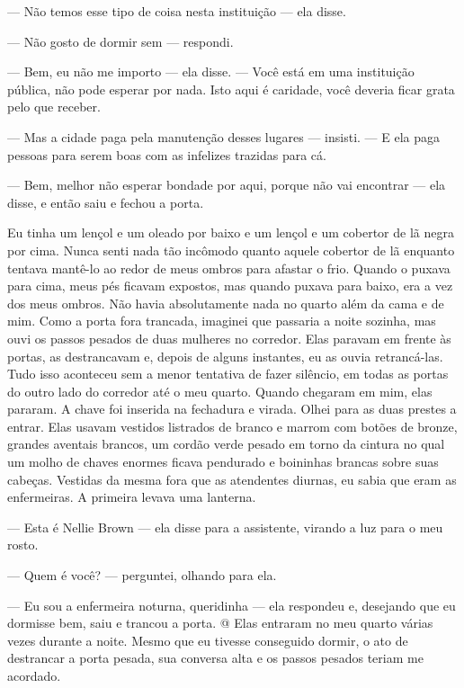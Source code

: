 --- Não temos esse tipo de coisa nesta instituição --- ela disse.

--- Não gosto de dormir sem --- respondi.

--- Bem, eu não me importo --- ela disse. --- Você está em uma
instituição pública, não pode esperar por nada. Isto aqui é caridade,
você deveria ficar grata pelo que receber.

--- Mas a cidade paga pela manutenção desses lugares --- insisti. --- E
ela paga pessoas para serem boas com as infelizes trazidas para cá.

--- Bem, melhor não esperar bondade por aqui, porque não vai encontrar
--- ela disse, e então saiu e fechou a porta.

Eu
tinha um lençol e um oleado por baixo e um lençol e um cobertor de lã
negra por cima. Nunca senti nada tão incômodo quanto aquele cobertor de
lã enquanto tentava mantê-lo ao redor de meus ombros para afastar o
frio. Quando o puxava para cima, meus pés ficavam expostos, mas quando
puxava para baixo, era a vez dos meus ombros. Não havia absolutamente
nada no quarto além da cama e de mim. Como a porta fora trancada,
imaginei que passaria a noite sozinha, mas ouvi os passos pesados de
duas mulheres no corredor. Elas paravam em frente às portas, as
destrancavam e, depois de alguns instantes, eu as ouvia retrancá-las.
Tudo isso aconteceu sem a menor tentativa de fazer silêncio, em todas as
portas do outro lado do corredor até o meu quarto. Quando chegaram em
mim, elas pararam. A chave foi inserida na fechadura e virada. Olhei
para as duas prestes a entrar. Elas usavam vestidos listrados de branco
e marrom com botões de bronze, grandes aventais brancos, um cordão verde
pesado em torno da cintura no qual um molho de chaves enormes ficava
pendurado e boininhas brancas sobre suas cabeças. Vestidas da mesma fora
que as atendentes diurnas, eu sabia que eram as enfermeiras. A primeira
levava uma lanterna.

--- Esta é Nellie Brown --- ela disse para a assistente, virando a luz
para o meu rosto.

--- Quem é você? --- perguntei, olhando para ela.

--- Eu sou a enfermeira noturna, queridinha --- ela respondeu e,
desejando que eu dormisse bem, saiu e trancou a porta. @ Elas entraram
no meu quarto várias vezes durante a noite. Mesmo que eu tivesse
conseguido dormir, o ato de destrancar a porta pesada, sua conversa alta
e os passos pesados teriam me acordado.

